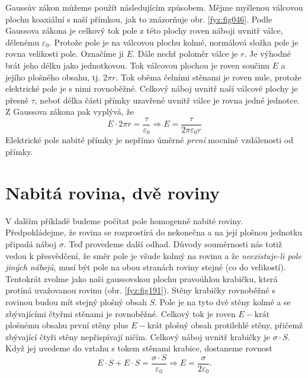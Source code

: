   Gaussův zákon můžeme použít následujícím způsobem. Mějme myšlenou válcovou plochu koaxiální s 
  naší přímkou, jak to znázorňuje obr. \ref{fyz:fig046}. Podle Gaussova zákona 
  je celkový tok pole z této plochy roven náboji uvnitř válce, dělenému \(\varepsilon_0\). 
  Protože pole je na válcovou plochu kolmé, normálová složka pole je rovna velikosti pole. 
  Označíme ji \(E\). Dále nechť poloměr válce je \(r\). Je výhodné brát jeho délku jako 
  jednotkovou. Tok válcovou plochou je roven součinu \(E\) a jejího plošného obsahu, tj. \(2\pi 
  r\). Tok oběma čelními stěnami je roven nule, protože elektrické pole je s nimi rovnoběžné. 
  Celkový náboj uvnitř naší válcové plochy je přesně \(\tau\), neboť délka části přímky 
  uzavřené uvnitř válce je rovna jedné jednotce. Z Gaussova zákona pak vyplývá, že
  \begin{equation}\label{fyz:eq_fey_elstat_gauss02}
    E\cdot2\pi r = \frac{\tau}{\varepsilon_0} \Rightarrow E = \frac{\tau}{2\pi\varepsilon_0 r}
  \end{equation}
  Elektrické pole nabité přímky je nepřímo úměrné \emph{první} mocnině vzdálenosti od přímky.
  
     

\section{Nabitá rovina, dvě roviny}\label{fyz:IIchapVsecV}
  V dalším příkladě budeme počítat pole homogenně nabité roviny. Předpokládejme, že rovina se 
  rozprostírá do nekonečna a na její plošnou jednotku připadá náboj \(\sigma\). Teď provedeme 
  další odhad. Důvody souměrnosti nás totiž vedou k přesvědčení, že směr pole je všude kolmý na 
  rovinu a že \emph{neexistuje-li pole jiných nábojů}, musí být pole na obou stranách roviny 
  stejné (co do velikostí). Tentokrát zvolme jako naši gaussovskou plochu pravoúhlou krabičku, 
  která protíná uvažovanou rovinu (obr. \ref{fyz:fig191}). Stěny krabičky rovnoběžné s rovinou 
  budou mít stejný plošný obsah \(S\). Pole je na tyto dvě stěny kolmé a se zbývajícími čtyřmi 
  stěnami je rovnoběžné. Celkový tok je roven \(E-\text{krát}\) plošnému obsahu první stěny plus 
  \(E-\text{krát}\) plošný obsah protilehlé stěny, přičemž zbývající čtyři stěny nepřispívají 
  ničím. Celkový náboj uvnitř krabičky je \(\sigma\cdot S\). Když jej uvedeme do vztahu s tokem 
  stěnami krabice, dostaneme rovnost
  \begin{equation}\label{fyz:eq_fey_elstat_gauss03}
    E\cdot S + E\cdot S = \frac{\sigma\cdot S}{\varepsilon_0} \Rightarrow 
    E = \frac{\sigma}{2\varepsilon_0}.
  \end{equation}
  
